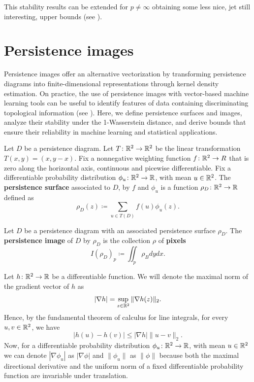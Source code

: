 This stability results can be extended for $ p \neq \infty $ obtaining some less nice, jet still interesting, upper bounds (see \cite{bubenik}).

\section{Persistence images} \label{sec:images}

Persistence images offer an alternative vectorization by transforming persistence diagrams into finite-dimensional representations through kernel density estimation. On practice, the use of persistence images with vector-based machine learning tools can be useful to identify features of data containing discriminating topological information (see \cite{adams}). Here, we define persistence surfaces and images, analyze their stability under the 1-Wasserstein distance, and derive bounds that ensure their reliability in machine learning and statistical applications.

\begin{definition}
    Let $ D $ be a persistence diagram. Let $ T \colon \mathbb R^2 \to \mathbb R^2 $ be the linear transformation $ T(x, y) = (x, y-x) $. Fix a nonnegative weighting function $ f \colon \mathbb R^2 \to R $ that is zero along the horizontal axis, continuous and picewise differentiable. Fix a differentiable probability distribution $ \phi_u \colon \mathbb R^2 \to \mathbb R $, with mean $ u \in \mathbb R^2 $. The {\bf persistence surface} associated to $ D $, by $ f $ and $ \phi_u $ is a function $ \rho_D \colon \mathbb R^2 \to \mathbb R $ defined as
    \begin{equation}
        \rho_D(z) \coloneq \sum_{u \in T(D)} f(u) \phi_u(z).
    \end{equation}
\end{definition}

\begin{definition}
    Let $ D $ be a persistence diagram with an associated persistence surface $ \rho_D $. The {\bf persistence image} of $ D $ by $ \rho_D $ is the collection $ \rho $ of {\bf pixels}
    \begin{equation}
        I(\rho_D)_p \coloneq \iint_p \rho_B dy dx.
    \end{equation}
\end{definition}

Let $ h \colon \mathbb R^2 \to \mathbb R $ be a differentiable function. We will denote the maximal norm of the gradient vector of $ h $ as
\begin{equation}
    |\nabla h | = \sup_{z \in \mathbb R^2} \| \nabla h(z) \|_2.
\end{equation}
Hence, by the fundamental theorem of calculus for line integrals, for every $ u, v \in \mathbb R^2 $, we have
\begin{equation}
    |h(u) - h(v)| \leq |\nabla h| \|u-v\|_2.
\end{equation}
Now, for a differentiable probability distribution $ \phi_u \colon \mathbb R^2 \to \mathbb R $, with mean $ u \in \mathbb R^2 $ we can denote $ |\nabla \phi_u| $ as $ |\nabla \phi| $ and $ \|\phi_u\| $ as $ \|\phi\| $ because both the maximal directional derivative and the uniform norm of a fixed differentiable probability function are invariable under translation.

